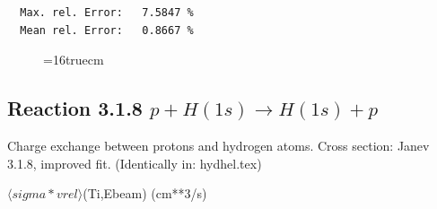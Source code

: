 \documentclass[12pt,dvips]{article}
\begin{document}
\begin{small}
\begin{verbatim}
  Max. rel. Error:   7.5847 %
  Mean rel. Error:   0.8667 %

\end{verbatim}\end{small}


\begin{figure} \label{2.3.9H3}
\epsfxsize=16truecm
\end{figure}
\newpage
\subsection{
Reaction 3.1.8  $ p + H(1s) \rightarrow H(1s) + p   $
}

 Charge exchange between protons and hydrogen
 atoms. Cross section: Janev  3.1.8, improved fit. (Identically in: hydhel.tex)

$  \langle sigma*vrel \rangle$(Ti,Ebeam)  (cm**3/s)
\end{document}
